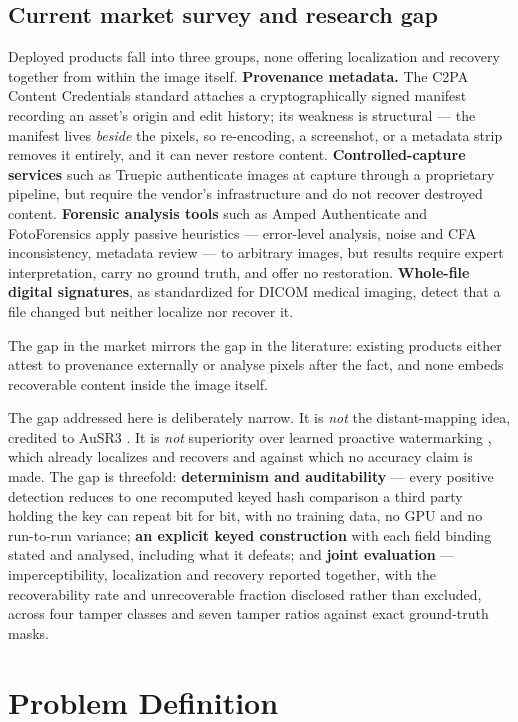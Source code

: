 \documentclass[12pt,a4paper]{article}
\begin{document}
\subsection{Current market survey and research gap}

Deployed products fall into three groups, none offering localization and
recovery together from within the image itself. \textbf{Provenance metadata.}
The C2PA Content Credentials standard attaches a cryptographically signed
manifest recording an asset's origin and edit history; its weakness is
structural --- the manifest lives \emph{beside} the pixels, so re-encoding, a
screenshot, or a metadata strip removes it entirely, and it can never restore
content. \textbf{Controlled-capture services} such as Truepic authenticate
images at capture through a proprietary pipeline, but require the vendor's
infrastructure and do not recover destroyed content. \textbf{Forensic analysis
tools} such as Amped Authenticate and FotoForensics apply passive heuristics
--- error-level analysis, noise and CFA inconsistency, metadata review --- to
arbitrary images, but results require expert interpretation, carry no ground
truth, and offer no restoration. \textbf{Whole-file digital signatures}, as
standardized for DICOM medical imaging, detect that a file changed but neither
localize nor recover it.

The gap in the market mirrors the gap in the literature: existing products
either attest to provenance externally or analyse pixels after the fact, and
none embeds recoverable content inside the image itself.

The gap addressed here is deliberately narrow. It is \emph{not} the
distant-mapping idea, credited to AuSR3 \cite{ausr3}. It is \emph{not}
superiority over learned proactive watermarking \cite{editguard}, which already
localizes and recovers and against which no accuracy claim is made. The gap is
threefold: \textbf{determinism and auditability} --- every positive detection
reduces to one recomputed keyed hash comparison a third party holding the key
can repeat bit for bit, with no training data, no GPU and no run-to-run
variance; \textbf{an explicit keyed construction} with each field binding
stated and analysed, including what it defeats; and \textbf{joint evaluation}
--- imperceptibility, localization and recovery reported together, with the
recoverability rate and unrecoverable fraction disclosed rather than excluded,
across four tamper classes and seven tamper ratios against exact ground-truth
masks.

\section{Problem Definition}
\end{document}
